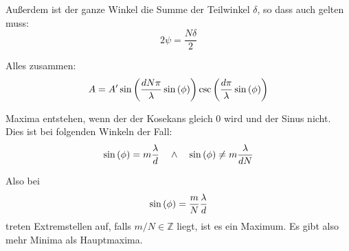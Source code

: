 \documentclass[11pt, ngerman, fleqn]{article}
\begin{document}
Außerdem ist der ganze Winkel die Summe der Teilwinkel $\delta$, so dass auch
gelten muss:
\[
	2 \psi = \frac{N\delta}{2}
\]

Alles zusammen:
\[
	A = A' \sin\del{\frac{d N \pi}{\lambda} \sin\del\phi} \csc\del{\frac{d \pi}{\lambda} \sin\del\phi}
\]

Maxima entstehen, wenn der der Kosekans gleich 0 wird und der Sinus nicht. Dies
ist bei folgenden Winkeln der Fall:
\[
	\sin\del\phi = m \frac{\lambda}{d}
	\quad\wedge\quad
	\sin\del\phi \neq m \frac{\lambda}{dN}
\]

Also bei
\[
	\sin\del\phi = \frac mN \frac{\lambda}{d}
\]
treten Extremstellen auf, falls $m/N \in \mathbb Z$ liegt, ist es ein Maximum.
Es gibt also mehr Minima als Hauptmaxima.



%
%
\end{document}
